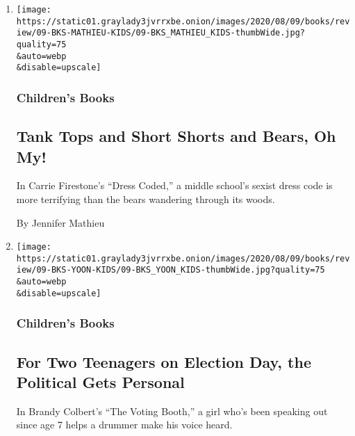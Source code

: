 \begin{enumerate}
\def\labelenumi{\arabic{enumi}.}
\item
  \href{/2020/08/01/books/review/carrie-firestone-dress-coded.html}{}

  \texttt{[image: https://static01.graylady3jvrrxbe.onion/images/2020/08/09/books/review/09-BKS-MATHIEU-KIDS/09-BKS\_MATHIEU\_KIDS-thumbWide.jpg?quality=75\\\&auto=webp\\\&disable=upscale]}

  \hypertarget{childrens-books}{%
  \subsubsection{Children's Books}\label{childrens-books}}

  \hypertarget{tank-tops-and-short-shorts-and-bears-oh-my}{%
  \subsection{Tank Tops and Short Shorts and Bears, Oh
  My!}\label{tank-tops-and-short-shorts-and-bears-oh-my}}

  In Carrie Firestone's ``Dress Coded,'' a middle school's sexist dress
  code is more terrifying than the bears wandering through its woods.

  By Jennifer Mathieu
\item
  \href{/2020/08/01/books/review/brandy-colbert-the-voting-booth.html}{}

  \texttt{[image: https://static01.graylady3jvrrxbe.onion/images/2020/08/09/books/review/09-BKS-YOON-KIDS/09-BKS\_YOON\_KIDS-thumbWide.jpg?quality=75\\\&auto=webp\\\&disable=upscale]}

  \hypertarget{childrens-books-1}{%
  \subsubsection{Children's Books}\label{childrens-books-1}}

  \hypertarget{for-two-teenagers-on-election-day-the-political-gets-personal}{%
  \subsection{For Two Teenagers on Election Day, the Political Gets
  Personal}\label{for-two-teenagers-on-election-day-the-political-gets-personal}}

  In Brandy Colbert's ``The Voting Booth,'' a girl who's been speaking
  out since age 7 helps a drummer make his voice heard.


\end{enumerate}
